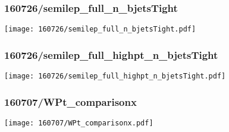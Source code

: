 \begin{frame}
   \frametitle{\small 160726/semilep\_full\_n\_bjetsTight}
   \centering
   \texttt{[image: 160726/semilep\_full\_n\_bjetsTight.pdf]}
\end{frame}

\begin{frame}
   \frametitle{\small 160726/semilep\_full\_highpt\_n\_bjetsTight}
   \centering
   \texttt{[image: 160726/semilep\_full\_highpt\_n\_bjetsTight.pdf]}
\end{frame}

\begin{frame}
   \frametitle{\small 160707/WPt\_comparisonx}
   \centering
   \texttt{[image: 160707/WPt\_comparisonx.pdf]}
\end{frame}

